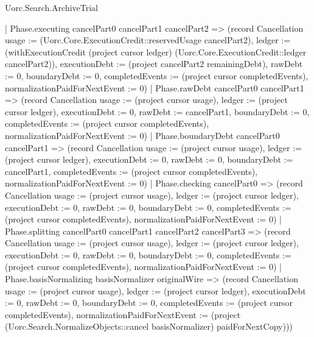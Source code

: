 \begin{lexlean}{Uorc.Search.ArchiveTrial}
\begin{semanticmodule}
{    | Phase.executing cancelPart0 cancelPart1 cancelPart2 => (record Cancellation {usage := (Uorc.Core.ExecutionCredit::reservedUsage cancelPart2), ledger := (withExecutionCredit (project cursor ledger) (Uorc.Core.ExecutionCredit::ledger cancelPart2)), executionDebt := (project cancelPart2 remainingDebt), rawDebt := 0, boundaryDebt := 0, completedEvents := (project cursor completedEvents), normalizationPaidForNextEvent := 0})
    | Phase.rawDebt cancelPart0 cancelPart1 => (record Cancellation {usage := (project cursor usage), ledger := (project cursor ledger), executionDebt := 0, rawDebt := cancelPart1, boundaryDebt := 0, completedEvents := (project cursor completedEvents), normalizationPaidForNextEvent := 0})
    | Phase.boundaryDebt cancelPart0 cancelPart1 => (record Cancellation {usage := (project cursor usage), ledger := (project cursor ledger), executionDebt := 0, rawDebt := 0, boundaryDebt := cancelPart1, completedEvents := (project cursor completedEvents), normalizationPaidForNextEvent := 0})
    | Phase.checking cancelPart0 => (record Cancellation {usage := (project cursor usage), ledger := (project cursor ledger), executionDebt := 0, rawDebt := 0, boundaryDebt := 0, completedEvents := (project cursor completedEvents), normalizationPaidForNextEvent := 0})
    | Phase.splitting cancelPart0 cancelPart1 cancelPart2 cancelPart3 => (record Cancellation {usage := (project cursor usage), ledger := (project cursor ledger), executionDebt := 0, rawDebt := 0, boundaryDebt := 0, completedEvents := (project cursor completedEvents), normalizationPaidForNextEvent := 0})
    | Phase.basisNormalizing basisNormalizer originalWire => (record Cancellation {usage := (project cursor usage), ledger := (project cursor ledger), executionDebt := 0, rawDebt := 0, boundaryDebt := 0, completedEvents := (project cursor completedEvents), normalizationPaidForNextEvent := (project (Uorc.Search.NormalizeObjects::cancel basisNormalizer) paidForNextCopy)}))
}
\end{semanticmodule}
\end{lexlean}
